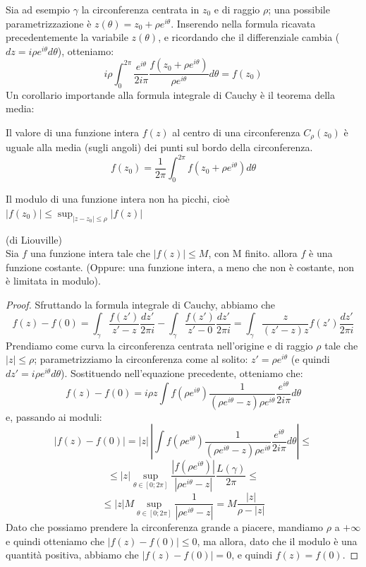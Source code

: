 Sia ad esempio $\gamma$ la circonferenza centrata in $z_0$ e di raggio $\rho$; una possibile parametrizzazione è $z(\theta)=z_0 + \rho e^{i\theta}$. Inserendo nella formula ricavata precedentemente la variabile $z(\theta)$, e ricordando che il differenziale cambia ($dz=i \rho e^{i\theta}d\theta$), otteniamo:
$$i \rho  \int_0 ^{2 \pi} \frac{e^{i\theta}}{2 i \pi} \frac{f(z_0+ \rho e^{i \theta})}{ \rho  e^{i\theta}} d\theta=f(z_0)$$
Un corollario importande alla formula integrale di Cauchy è il teorema della media:
\begin{teorema}
Il valore di una funzione intera $f(z)$ al centro di una circonferenza $C_{\rho} (z_0)$ è uguale alla media (sugli angoli) dei punti sul bordo della circonferenza.
$$f(z_0)=\frac{1}{2 \pi} \int_0 ^{2 \pi} f(z_0 +  \rho e^{i\theta}) d\theta$$
\end{teorema}
\begin{corollario}
Il modulo di una funzione intera non ha picchi, cioè $|f(z_0)| \leq \sup_{|z-z_0| \leq  \rho } |f(z)|$
\end{corollario}
\begin{teorema} (di Liouville)\\
Sia $f$ una funzione intera tale che $|f(z)| \leq M$, con M finito. allora $f$ è una funzione costante. (Oppure: una funzione intera, a meno che non è costante, non è limitata in modulo).
\end{teorema}
\begin{proof}
Sfruttando la formula integrale di Cauchy, abbiamo che 
$$f(z)-f(0)=\int_{\gamma} \frac{f(z')}{z'-z} \frac{dz'}{2 \pi i}-\int_{\gamma} \frac{f(z')}{z'-0} \frac{dz'}{2 \pi i}=\int_{\gamma} \frac{z}{(z'-z)z} f(z') \frac{dz'}{2 \pi i}$$
Prendiamo come curva la circonferenza centrata nell'origine e di raggio $\rho$ tale che $|z| \leq \rho$; parametrizziamo la circonferenza come al solito: $z'=\rho e^{i\theta}$ (e quindi $dz'=i \rho e^{i\theta} d\theta$). Sostituendo nell'equazione precedente, otteniamo che:
$$f(z)-f(0)=i \rho z \int f(\rho e^{i\theta}) \frac{1}{(\rho e^{i\theta}-z)\rho e^{i\theta}} \frac{e^{i\theta}}{2 i \pi} d\theta$$
e, passando ai moduli:
$$|f(z)-f(0)|=|z| \, \left|\int f(\rho e^{i\theta}) \frac{1}{(\rho e^{i\theta}-z)\rho e^{i\theta}} \frac{e^{i\theta}}{2 i \pi} d\theta \right| \leq$$
$$\leq |z|\sup_{\theta \in [0;2\pi]} \frac{|f(\rho e^{i\theta})|}{|\rho e^{i\theta}-z|} \frac{L(\gamma)}{2 \pi} \leq$$
$$\leq |z| M \sup_{\theta \in [0;2\pi]} \frac{1}{|\rho e^{i\theta}-z|} =M \frac {|z|}{\rho-|z|}$$
Dato che possiamo prendere la circonferenza grande a piacere, mandiamo $\rho$ a $+\infty$ e quindi otteniamo che $|f(z)-f(0)| \leq 0$, ma allora, dato che il modulo è una quantità positiva, abbiamo che $|f(z)-f(0)|=0$, e quindi $f(z)=f(0)$.

\end{proof}
